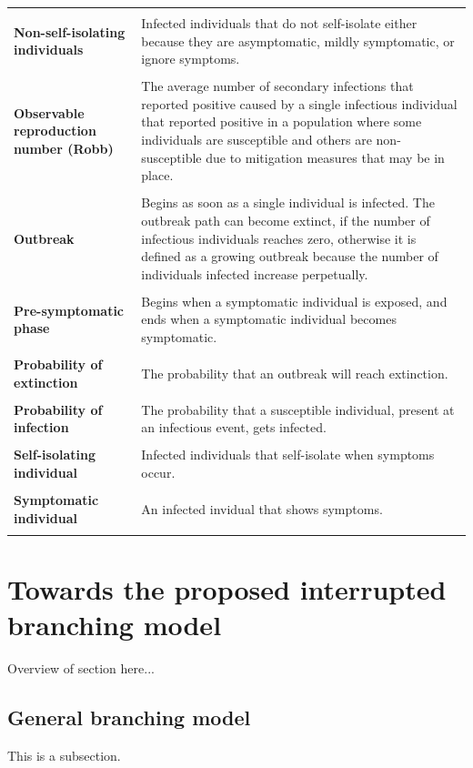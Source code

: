 \documentclass[sr]{drdc-report}
\begin{document}
\begin{table}
\begin{tabular}{|p{5cm}|p{10cm}|}
&\\
\textbf{Non-self-isolating individuals} & Infected individuals that do not self-isolate either because they are asymptomatic, mildly symptomatic, or ignore symptoms.\\
&\\
\textbf{Observable reproduction number (Robb)} & The average number of secondary infections that reported positive caused by a single infectious individual that reported positive in a population where some individuals are susceptible and others are non-susceptible due to mitigation measures that may be in place.\\
&\\
\textbf{Outbreak} & Begins as soon as a single individual is infected. The outbreak path can become extinct, if the number of infectious individuals reaches zero, otherwise it is defined as a growing outbreak because the number of individuals infected increase perpetually.\\
&\\
\textbf{Pre-symptomatic phase} & Begins when a symptomatic individual is exposed, and ends when a symptomatic individual becomes symptomatic.\\
&\\
\textbf{Probability of extinction} & The probability that an outbreak will reach extinction.\\
&\\
\textbf{Probability of infection} & The probability that a susceptible individual, present at an infectious event, gets infected.\\
&\\
\textbf{Self-isolating individual} & Infected individuals that self-isolate when symptoms occur.\\
&\\
\textbf{Symptomatic individual} & An infected invidual that shows symptoms.\\
&\\
\hline
\end{tabular}
\end{table}

\section{Towards the proposed interrupted branching model}\label{Definition_section_label}

Overview of section here... 

\subsection{General branching model}
This is a subsection.
\end{document}

